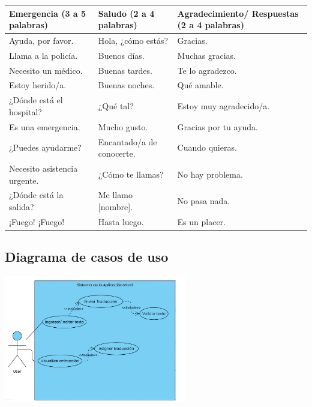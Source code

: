     



\noindent
\begin{tabularx}{\textwidth}{|X|X|X|}
\hline
\textbf{Emergencia (3 a 5 palabras)} & \textbf{Saludo (2 a 4 palabras)} & \textbf{Agradecimiento/ Respuestas (2 a 4 palabras)} \\ \hline
Ayuda, por favor. & Hola, ¿cómo estás? & Gracias. \\ \hline
Llama a la policía. & Buenos días. & Muchas gracias. \\ \hline
Necesito un médico. & Buenas tardes. & Te lo agradezco. \\ \hline
Estoy herido/a. & Buenas noches. & Qué amable. \\ \hline
¿Dónde está el hospital? & ¿Qué tal? & Estoy muy agradecido/a. \\ \hline
Es una emergencia. & Mucho gusto. & Gracias por tu ayuda. \\ \hline
¿Puedes ayudarme? & Encantado/a de conocerte. & Cuando quieras. \\ \hline
Necesito asistencia urgente. & ¿Cómo te llamas? & No hay problema. \\ \hline
¿Dónde está la salida? & Me llamo [nombre]. & No pasa nada. \\ \hline
¡Fuego! ¡Fuego! & Hasta luego. & Es un placer. \\ \hline
\end{tabularx}


\subsection{Diagrama de casos de uso}
\begin{center}
    \includegraphics[width=0.6\textwidth]{Images/Cap 3/casodeuso1.png}
\end{center}

